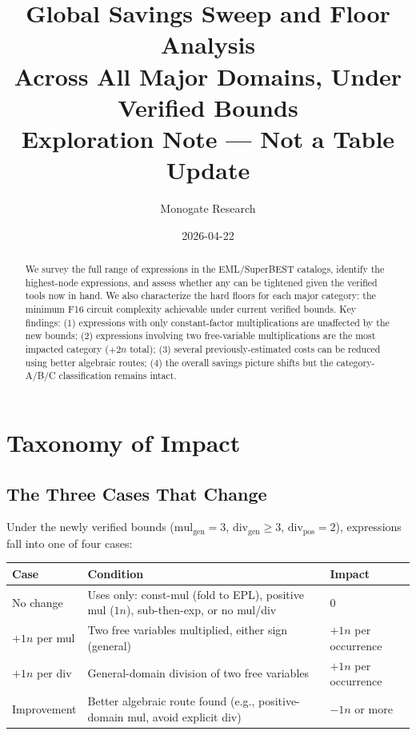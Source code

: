 \documentclass[11pt]{article}
\title{Global Savings Sweep and Floor Analysis\\
\large Across All Major Domains, Under Verified Bounds\\
Exploration Note --- Not a Table Update}
\author{Monogate Research}
\date{2026-04-22}
\begin{document}
\maketitle

\begin{abstract}
We survey the full range of expressions in the EML/SuperBEST catalogs,
identify the highest-node expressions, and assess whether any can be tightened
given the verified tools now in hand.
We also characterize the hard floors for each major category:
the minimum F16 circuit complexity achievable under current verified bounds.
Key findings: (1) expressions with only constant-factor multiplications are unaffected
by the new bounds; (2) expressions involving two free-variable multiplications are the
most impacted category ($+2n$ total); (3) several previously-estimated costs can be
reduced using better algebraic routes; (4) the overall savings picture shifts
but the category-A/B/C classification remains intact.
\end{abstract}

\tableofcontents

\section{Taxonomy of Impact}

\subsection{The Three Cases That Change}

Under the newly verified bounds ($\mathrm{mul}_\mathrm{gen} = 3$, $\mathrm{div}_\mathrm{gen} \geq 3$,
$\mathrm{div}_\mathrm{pos} = 2$), expressions fall into one of four cases:

\begin{center}
\begin{tabular}{p{3cm}p{6cm}p{3cm}}
\toprule
Case & Condition & Impact \\
\midrule
No change & Uses only: const-mul (fold to EPL), positive mul ($1n$), sub-then-exp, or no mul/div & $0$ \\
$+1n$ per mul & Two free variables multiplied, either sign (general) & $+1n$ per occurrence \\
$+1n$ per div & General-domain division of two free variables & $+1n$ per occurrence \\
Improvement & Better algebraic route found (e.g., positive-domain mul, avoid explicit div) & $-1n$ or more \\
\bottomrule
\end{tabular}
\end{center}
\end{document}
